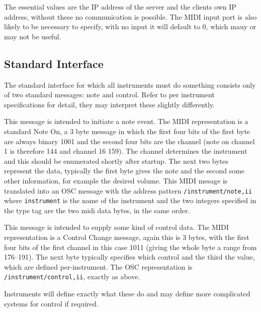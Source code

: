 \documentclass[../main.tex]{subfiles}
\begin{document}
The essential values are the IP address of the server and the clients own IP address, without these no communication is possible. The MIDI input port is
also likely to be necessary to specify, with no input it will default to 0, which mauy or may not be useful.

\subsection{Standard Interface}
The standard interface for which all instruments must do something consists only of two standard messages: note and control.
Refer to per instrument specifications for detail, they may interpret these slightly differently.
\begin{description} [style=multiline, labelwidth=\widthof{\bfseries Control}]
	\item [Note] This message is intended to initiate a note event. The MIDI representation is a standard Note On, a 3 byte message in which the first
			   four bits of the first byte are always binary 1001 and the second four bits are the channel (note on channel 1 is therefore 144 and
			    channel 16 159). The channel determines the instrument
			   and this should be enumerated shortly after startup. The next two bytes represent the data, typically the first byte gives the
			   note and the second some other information, for example the desired volume. This MIDI mesage is translated into an OSC message
			   with the address pattern \texttt{/instrument/note,ii} where \texttt{instrument} is the name of the instrument and the two integers 
			   specified in the type tag are the two midi data bytes, in the same order.
	\item [\hbox{Control}] This message is intended to supply some kind of control data. The MIDI representation is a Control Change message, again 
			       this is 3 bytes, with the first four bits of the first channel in this case 1011 (giving the whole byte a range from 176--191). The 
			       next byte typically specifies which control and the third the value, which are defined per-instrument.
			       The OSC representation is \texttt{/instrument/control,ii}, exactly as above.
			 
\end{description}

Instruments will define exactly what these do and may define more complicated systems for control if required.
\end{document}
